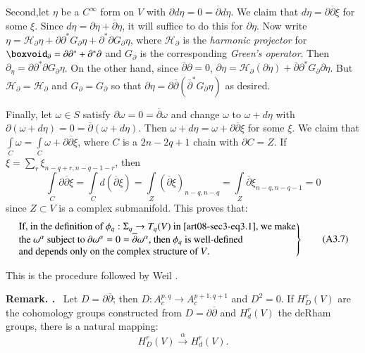 Second,\pageoriginale let $\eta$ be a $C^{\infty}$ form on $V$ with $\partial d\eta=0=\overline{\partial}d\eta$. We claim that $d\eta=\partial\overline{\partial}\xi$ for some $\xi$. Since $d\eta=\partial\eta+\overline{\partial}\eta$, it will suffice to do this for $\partial\eta$. Now write $\eta=\mathscr{H}_{\partial}\eta+\partial\partial^{*}G_{\partial}\eta+\partial^{*}\partial G_{\partial}\eta$, where $\mathscr{H}_{\partial}$ is the {\em harmonic projector} for $\boxvoid_{\partial}=\partial\partial^{*}+\partial^{*}\partial$ and $G_{\partial}$ is the corresponding {\em Green's operator}. Then $\partial_{\eta}=\partial\partial^{*}\partial G_{\partial}\eta$. On the other hand, since $\overline{\partial}\partial=0$, $\partial\eta=\mathscr{H}_{\partial}(\partial\eta)+\overline{\partial}\partial^{*}G_{\partial}\partial\eta$. But $\mathscr{H}_{\partial}=\mathscr{H}_{\partial}$ and $G_{\partial}=G_{\partial}$ so that $\partial\eta=\partial\overline{\partial}(\overline{\partial}^{*}G_{\partial}\eta)$ as desired.

Finally, let $\omega\in S$ satisfy $\partial \omega=0=\overline{\partial}\omega$ and change $\omega$ to $\omega+d\eta$ with $\partial(\omega+d\eta)=0=\overline{\partial}(\omega+d\eta)$. Then $\omega+d\eta=\omega+\partial\overline{\partial}\xi$ for some $\xi$. We claim that $\int\limits_{C}\omega=\int\limits_{C}\omega+\partial\overline{\partial}\xi$, where $C$ is a $2n-2q+1$ chain with $\partial C=Z$. If $\xi=\sum\limits_{r}\xi_{n-q+r,n-q-1-r}$, then
$$
\int\limits_{C}\partial\overline{\partial}\xi=\int\limits_{C}d(\overline{\partial}\xi)=\int\limits_{Z}(\overline{\partial}\xi)_{n-q,n-q}=\int\limits_{Z}\overline{\partial}\xi_{n-q,n-q-1}=0
$$
since $Z\subset V$ is a complex submanifold. This proves that:
\begin{equation*}
\left.
\begin{array}{@{}l@{}}
\text{If, in the definition of  $\phi_{q}:\Sigma_{q}\to T_{q}(V)$  in \eqref{art08-sec3-eq3.1}, we make}\\
\text{the $\omega^{\alpha}$ subject to $\partial\omega^{\alpha}=0=\overline{\partial}\omega^{\alpha}$, then $\phi_{q}$ is well-defined}\\
\text{and depends only on the complex structure of $V$.}
\end{array}
\right\}\tag{A3.7}\label{art08-sec3-eqA3.7}
\end{equation*}

This is the procedure followed by Weil \cite{art08-key22}.

\medskip
\noindent
{\bf Remark. .\label{art08-A3.8}}~ Let $D=\partial\overline{\partial}$; then $D:A^{p,q}_{c}\to A^{p+1,q+1}_{c}$ and $D^{2}=0$. If $H^{r}_{D}(V)$ are the cohomology groups constructed from $D=\partial\overline{\partial}$ and $H^{r}_{d}(V)$ the deRham groups, there is a natural mapping:
\begin{equation*}
H^{r}_{D}(V)\xrightarrow{\alpha}H^{r}_{d}(V).\tag{A3.9}\label{art08-sec3-eqA3.9}
\end{equation*}

